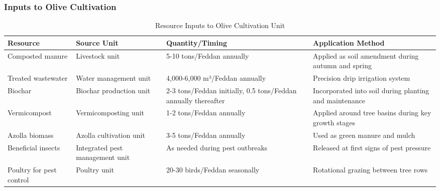 \subsubsection{Inputs to Olive Cultivation}
\begin{table}[h]
\centering
\begin{tabular}{|p{4cm}|p{4cm}|p{4cm}|p{4cm}|}
\hline
\textbf{Resource} & \textbf{Source Unit} & \textbf{Quantity/Timing} & \textbf{Application Method} \\
\hline
Composted manure & Livestock unit & 5-10 tons/Feddan annually & Applied as soil amendment during autumn and spring \\
\hline
Treated wastewater & Water management unit & 4,000-6,000 m³/Feddan annually & Precision drip irrigation system \\
\hline
Biochar & Biochar production unit & 2-3 tons/Feddan initially, 0.5 tons/Feddan annually thereafter & Incorporated into soil during planting and maintenance \\
\hline
Vermicompost & Vermicomposting unit & 1-2 tons/Feddan annually & Applied around tree basins during key growth stages \\
\hline
Azolla biomass & Azolla cultivation unit & 3-5 tons/Feddan annually & Used as green manure and mulch \\
\hline
Beneficial insects & Integrated pest management unit & As needed during pest outbreaks & Released at first signs of pest pressure \\
\hline
Poultry for pest control & Poultry unit & 20-30 birds/Feddan seasonally & Rotational grazing between tree rows \\
\hline
\end{tabular}
\caption{Resource Inputs to Olive Cultivation Unit}
\end{table}

